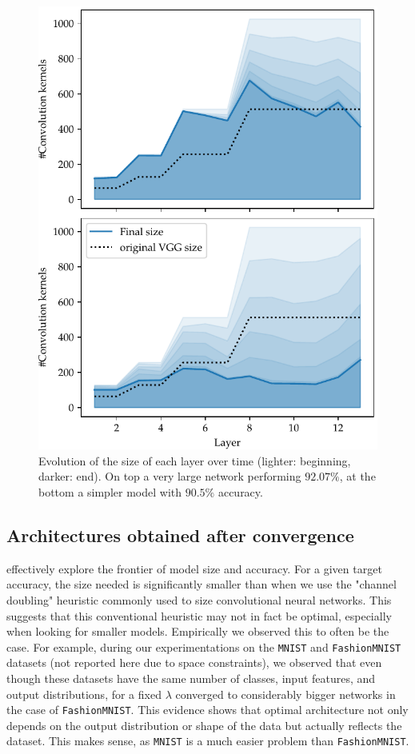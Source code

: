 \begin{figure}[htb]
\begin{center}
\vspace{-.1in}
\includegraphics[width=.6\columnwidth]{size_evolution}
\vspace*{-5mm} 
\caption{ Evolution of the size of
  each layer over time (lighter: beginning, darker: end). On top a very large
  network performing $92.07\%$, at the bottom a simpler model with $90.5\%$
  accuracy. 
} 
\label{fig:network_size_evolution}
\end{center}
\vspace*{-4mm}
\end{figure}

\subsection{Architectures obtained after convergence}
\shrink effectively explore the frontier of model size and accuracy. For a
given target accuracy, the size needed is significantly smaller than when we use the
"channel doubling" heuristic commonly used to size convolutional neural networks.
This suggests that this conventional heuristic may not in fact be optimal,
especially when looking for smaller models.  Empirically we observed this to
often be the case.  For example, during our experimentations on the
\texttt{MNIST} \cite{Lecun1998} and \texttt{FashionMNIST} \cite{Xiao2017}
datasets (not reported here due to space constraints), we observed that even
though these datasets have the same number of classes, input features, and
output distributions, for a fixed $\lambda$ \shrink converged to
considerably bigger networks in the case of \texttt{FashionMNIST}. This evidence
shows that optimal architecture not only depends on the output distribution or
shape of the data but actually reflects the dataset.  This makes sense, as
\texttt{MNIST} is a much easier problem than \texttt{FashionMNIST}.


